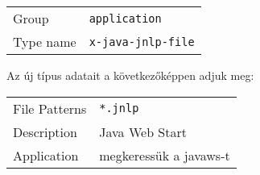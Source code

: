 \begin{tabular}{l@{~:~~~}l}      
Group         & \verb!application!           \\
Type name     & \verb!x-java-jnlp-file!      \\
\end{tabular}

Az új típus adatait a következőképpen adjuk meg:

\begin{tabular}{l@{~:~~~}l}
File Patterns & \verb!*.jnlp!                     \\
Description   & Java Web Start                    \\
Application   & megkeressük a javaws-t            \\
\end{tabular}
 